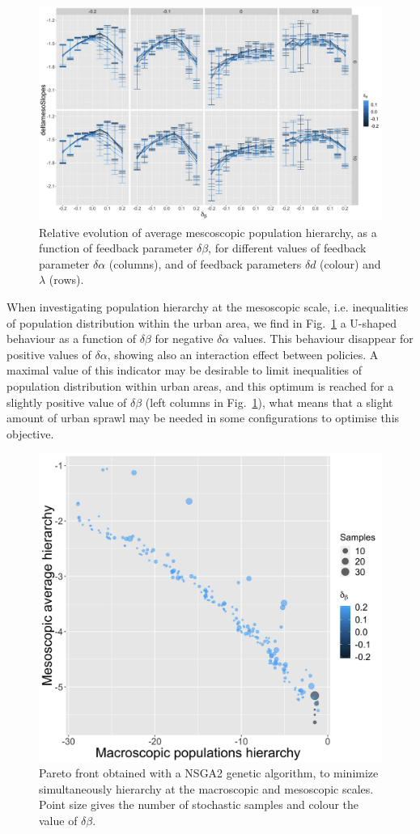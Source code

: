 \documentclass[referee,lineno,pdflatex,sn-apa]{sn-jnl}
\begin{document}
\begin{figure}[h]
	\includegraphics[width=\textwidth]{figures/Fig6.jpg}
	\caption{Relative evolution of average mescoscopic population hierarchy, as a function of feedback parameter $\delta \beta$, for different values of feedback parameter $\delta \alpha$ (columns), and of feedback parameters $\delta d$ (colour) and $\lambda$ (rows).\label{fig:fig6}}
\end{figure}

When investigating population hierarchy at the mesoscopic scale, i.e. inequalities of population distribution within the urban area, we find in Fig.~\ref{fig:fig6} a U-shaped behaviour as a function of $\delta \beta$ for negative $\delta \alpha$ values. This behaviour disappear for positive values of $\delta \alpha$, showing also an interaction effect between policies. A maximal value of this indicator may be desirable to limit inequalities of population distribution within urban areas, and this optimum is reached for a slightly positive value of $\delta \beta$ (left columns in Fig.~\ref{fig:fig6}), what means that a slight amount of urban sprawl may be needed in some configurations to optimise this objective.



\begin{figure}[h]
	\begin{center}
	\includegraphics[width=0.6\linewidth]{figures/Fig7.jpg}
	\end{center}
	\caption{Pareto front obtained with a NSGA2 genetic algorithm, to minimize simultaneously hierarchy at the macroscopic and mesoscopic scales. Point size gives the number of stochastic samples and colour the value of $\delta \beta$.\label{fig:fig7}}
\end{figure}
\end{document}
